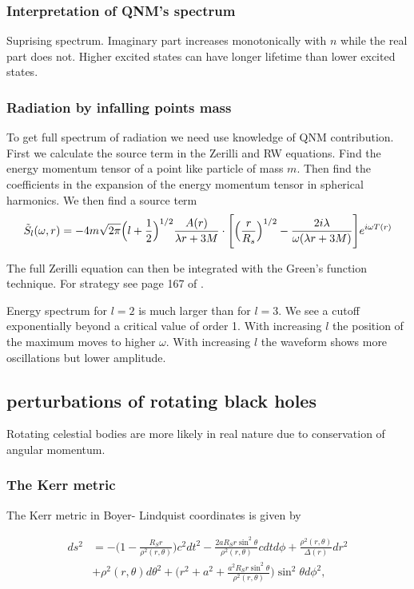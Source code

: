 \documentclass[12 pt]{article}
\begin{document}
\subsubsection{Interpretation of QNM's spectrum}
Suprising spectrum. Imaginary part increases monotonically with $n$ while the real part does not. Higher excited states can have longer lifetime than lower excited states. 

\subsubsection{Radiation by infalling points mass}

To get full spectrum of radiation we need use knowledge of QNM contribution. First we calculate the source term in the Zerilli and RW equations.  Find the energy momentum tensor of a point like particle of mass $m$. Then find the coefficients in the expansion of the energy momentum tensor in spherical harmonics. We then find a source term
\begin{equation}
	\Tilde{S}_l(\omega,r) = -4m\sqrt{2 \pi} \Big(l + \frac{1}{2}\Big)^{1/2} \frac{A(r)}{\lambda r + 3M} \cdot \Bigg[\Big(\frac{r}{R_s}\Big)^{1/2} - \frac{2i \lambda}{\omega (\lambda r + 3M)} \Bigg]e^{i \omega T(r)}
\end{equation}

The full Zerilli equation can then be integrated with the Green's function technique. For strategy see page 167 of \cite{maggiore}. 

Energy spectrum for $l=2$ is much larger than for $l=3$. We see a cutoff exponentially beyond a critical value of order 1. With increasing $l$ the position of the maximum moves to higher $\omega$. With increasing $l$ the waveform shows more oscillations but lower amplitude. 

\subsection{perturbations of rotating black holes}
Rotating celestial bodies are more likely in real nature due to conservation of angular momentum. 

\subsubsection{The Kerr metric}

The Kerr metric in Boyer- Lindquist coordinates is given by

\begin{align*}
	ds^2 &= -\Big(1- \frac{R_S r}{\rho^2(r,\theta)} \Big) c^2 dt^2 - \frac{2 a R_S r \sin^2 \theta}{\rho^2(r,\theta)} c dt d\phi + \frac{\rho^2(r,\theta)}{\Delta(r)} dr^2 \\
	&+ \rho^2(r,\theta)d\theta^2 + \Big(r^2 + a^2 + \frac{a^2 R_S r \sin^2 \theta}{\rho^2(r,\theta)} \Big) \sin^2 \theta d\phi^2 ,
\end{align*}
\end{document}
